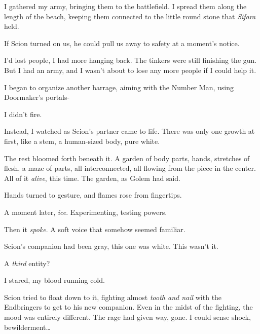 I gathered my army, bringing them to the battlefield.  I spread them along the length of the beach, keeping them connected to the little round stone that \emph{Sifara} held.



If Scion turned on us, he could pull us away to safety at a moment's notice.



I'd lost people, I had more hanging back.  The tinkers were still finishing the gun.  But I had an army, and I wasn't about to lose any more people if I could help it.



I began to organize another barrage, aiming with the Number Man, using Doormaker's portals-



I didn't fire.



Instead, I watched as Scion's partner came to life.  There was only one growth at first, like a stem, a human-sized body, pure white.



The rest bloomed forth beneath it.  A garden of body parts, hands, stretches of flesh, a maze of parts, all interconnected, all flowing from the piece in the center.  All of it \emph{alive}, this time.  The garden, as Golem had said.



Hands turned to gesture, and flames rose from fingertips.



A moment later, \emph{ice}.  Experimenting, testing powers.



Then it \emph{spoke}.  A soft voice that somehow seemed familiar.



Scion's companion had been gray, this one was white.  This wasn't it.



A \emph{third} entity?



I stared, my blood running cold.



Scion tried to float down to it, fighting almost\emph{ tooth and nail} with the Endbringers to get to his new companion.  Even in the midst of the fighting, the mood was entirely different.  The rage had given way, gone.  I could sense shock, bewilderment\ldots



